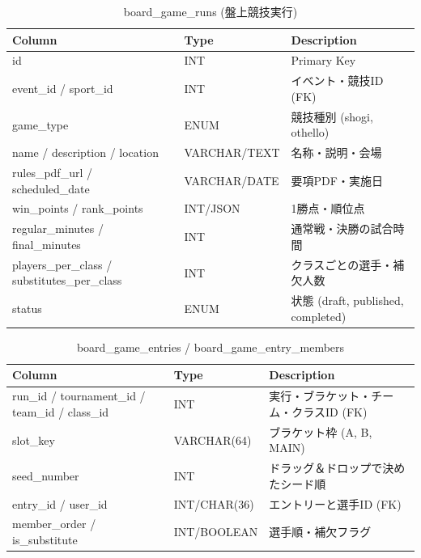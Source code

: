 \documentclass[paper=a4, fontsize=11pt]{jlreq}
\begin{document}
\begin{table}[H]
    \centering
    \caption{board\_game\_runs (盤上競技実行)}
    \begin{tabularx}{\textwidth}{|l|l|X|}
        \toprule
        Column & Type & Description \\
        \midrule
        id & INT & Primary Key \\
        event\_id / sport\_id & INT & イベント・競技ID (FK) \\
        game\_type & ENUM & 競技種別 (shogi, othello) \\
        name / description / location & VARCHAR/TEXT & 名称・説明・会場 \\
        rules\_pdf\_url / scheduled\_date & VARCHAR/DATE & 要項PDF・実施日 \\
        win\_points / rank\_points & INT/JSON & 1勝点・順位点 \\
        regular\_minutes / final\_minutes & INT & 通常戦・決勝の試合時間 \\
        players\_per\_class / substitutes\_per\_class & INT & クラスごとの選手・補欠人数 \\
        status & ENUM & 状態 (draft, published, completed) \\
        \bottomrule
    \end{tabularx}
\end{table}

\begin{table}[H]
    \centering
    \caption{board\_game\_entries / board\_game\_entry\_members}
    \begin{tabularx}{\textwidth}{|l|l|X|}
        \toprule
        Column & Type & Description \\
        \midrule
        run\_id / tournament\_id / team\_id / class\_id & INT & 実行・ブラケット・チーム・クラスID (FK) \\
        slot\_key & VARCHAR(64) & ブラケット枠 (A, B, MAIN) \\
        seed\_number & INT & ドラッグ＆ドロップで決めたシード順 \\
        entry\_id / user\_id & INT/CHAR(36) & エントリーと選手ID (FK) \\
        member\_order / is\_substitute & INT/BOOLEAN & 選手順・補欠フラグ \\
        \bottomrule
    \end{tabularx}
\end{table}
\end{document}

